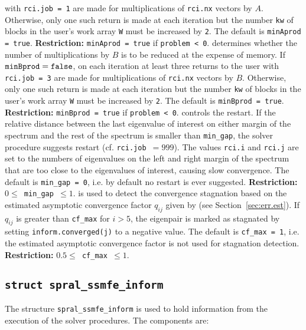 \begin{description}
with {\tt rci.job = 1} are
made for multiplications of {\tt rci.nx} vectors by $A$.
Otherwise,  only one such return is made at each iteration but 
the number {\tt kw} of blocks in the user's work array {\tt W} 
must be increased by {\tt 2}.
The default is {\tt minAprod = true}.
{\bf Restriction:} {\tt minAprod = true} if {\tt problem < 0}.
%
determines whether the number of multiplications by $B$ 
is to be reduced at the expense of memory. 
If ${\tt minBprod = false}$, 
on each iteration at least three returns to the user
with {\tt rci.job = 3} are
made for multiplications of {\tt rci.nx} vectors by $B$.
Otherwise,  only one such return is made at each iteration but 
the number {\tt kw} of blocks in the user's work array {\tt W} 
must be increased by {\tt 2}.
The default is {\tt minBprod = true}.
{\bf Restriction:} {\tt minBprod = true} if {\tt problem < 0}.
%
controls the restart.
If the relative distance between the last eigenvalue of interest
on either margin of the spectrum and the rest of the spectrum
is smaller than {\tt min\_gap},
the solver procedure suggests restart
(cf. {\tt rci.job $= 999$}).
The values 
{\tt rci.i}
and
{\tt rci.j}
are set to the numbers of eigenvalues on the left and right
margin of the spectrum that are too close to the eigenvalues
of interest, causing slow convergence.
The default is {\tt min\_gap = 0}, i.e.
by default no restart is ever suggested.
{\bf Restriction:} {\tt $0 \le$ min\_gap $\le 1$}.
%
is used to detect the convergence stagnation
based on 
the estimated asymptotic convergence factor 
$q_{ij}$ given by 
(see Section~\ref{sec:err.est}).
If $q_{ij}$ is greater than {\tt cf\_max} for $i > 5$,
the eigenpair is marked as stagnated by setting
{\tt inform.converged(j)} to a negative value.
The default is {\tt cf\_max = 1}, i.e.
the estimated asymptotic convergence factor
is not used for stagnation detection.
{\bf Restriction:} {\tt $0.5 \le$ cf\_max $\le 1$}.
%
\end{description}

\subsection{\texttt{struct spral\_ssmfe\_inform}} \label{ssmfe:type:inform}

The structure {\tt spral\_ssmfe\_inform} is used
to hold information from the execution of
the solver procedures.
The components are:

